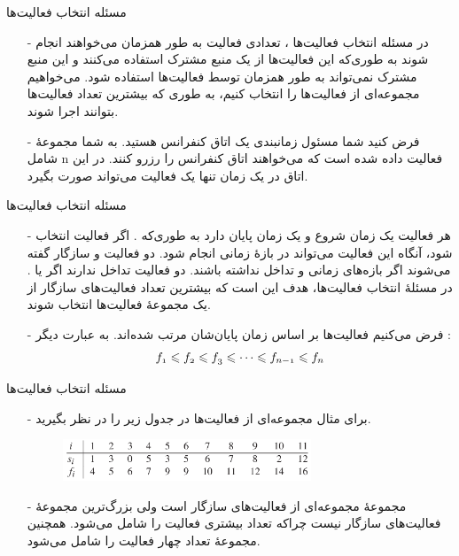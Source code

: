 \begin{frame}{‌مسئله انتخاب فعالیت‌ها}
\begin{itemize}\itemr
\item[-]
در مسئله انتخاب فعالیت‌ها
، تعدادی فعالیت به طور همزمان می‌خواهند انجام شوند به طوری‌که این فعالیت‌ها از یک منبع مشترک استفاده می‌کنند و این منبع مشترک نمی‌تواند به طور همزمان توسط فعالیت‌ها استفاده شود. می‌خواهیم مجموعه‌ای از فعالیت‌ها را انتخاب کنیم، به طوری که بیشترین تعداد فعالیت‌ها بتوانند اجرا شوند.
\item[-]
فرض کنید شما مسئول زمانبندی یک اتاق کنفرانس هستید. به شما مجموعهٔ
شامل n فعالیت داده شده است که می‌خواهند اتاق کنفرانس را رزرو کنند. در این اتاق در یک زمان تنها یک فعالیت می‌تواند صورت بگیرد.
\end{itemize}
\end{frame}


\begin{frame}{‌مسئله انتخاب فعالیت‌ها}
\begin{itemize}\itemr
\item[-]
هر فعالیت
یک زمان شروع
و یک زمان پایان
دارد به طوری‌که
.
اگر فعالیت
انتخاب شود، آنگاه این فعالیت می‌تواند در بازهٔ زمانی
\m{[s_i,f_i)}
انجام شود. دو فعالیت
و
سازگار
گفته می‌شوند اگر بازه‌های زمانی
\m{[s_i,f_i)}
و
\m{[s_j,f_j)}
تداخل نداشته باشند. دو فعالیت تداخل ندارند اگر
یا
. در مسئلهٔ انتخاب فعالیت‌ها، هدف این است که بیشترین تعداد فعالیت‌های سازگار از یک مجموعهٔ فعالیت‌ها انتخاب شوند.
\item[-]
فرض می‌کنیم فعالیت‌ها بر اساس زمان پایان‌شان مرتب شده‌اند. به عبارت دیگر :
\begin{align*}
\mathnormal{f_1 \leqslant f_2 \leqslant f_3 \leqslant \cdots \leqslant f_{n-1} \leqslant f_n}
\end{align*}
\end{itemize}
\end{frame}


\begin{frame}{‌مسئله انتخاب فعالیت‌ها}
\begin{itemize}\itemr
\item[-]
برای مثال مجموعه‌ای از فعالیت‌ها در جدول زیر را در نظر بگیرید.
\begin{figure}
\includegraphics[width=0.7\textwidth]{figs/chap05/activity-example}
\end{figure}
\item[-]
مجموعهٔ
مجموعه‌ای از فعالیت‌های سازگار است ولی بزرگ‌ترین مجموعهٔ فعالیت‌های سازگار نیست چراکه
تعداد بیشتری فعالیت را شامل می‌شود.
همچنین مجموعهٔ
تعداد چهار فعالیت را شامل می‌شود.
\end{itemize}
\end{frame}



